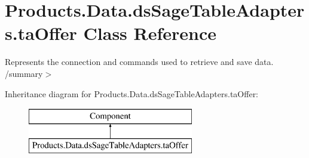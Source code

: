 \hypertarget{class_products_1_1_data_1_1ds_sage_table_adapters_1_1ta_offer}{}\section{Products.\+Data.\+ds\+Sage\+Table\+Adapters.\+ta\+Offer Class Reference}
\label{class_products_1_1_data_1_1ds_sage_table_adapters_1_1ta_offer}


Represents the connection and commands used to retrieve and save data. /summary$>$  


Inheritance diagram for Products.\+Data.\+ds\+Sage\+Table\+Adapters.\+ta\+Offer\+:\begin{figure}[H]
\begin{center}
\leavevmode
\includegraphics[height=2.000000cm]{class_products_1_1_data_1_1ds_sage_table_adapters_1_1ta_offer}
\end{center}
\end{figure}
